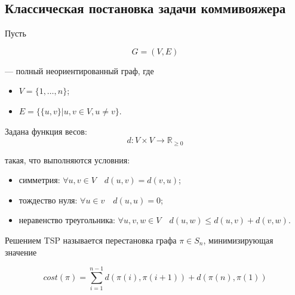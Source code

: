 \subsection{Классическая постановка задачи коммивояжера}

Пусть

\begin{equation}
    G = (V, E)
\end{equation}

--- полный неориентированный граф, где

\begin{itemize}
    \item $V = \{1, \dots, n\}$;
    \item $E = \{\{u, v\} | u, v \in V, u \neq v\}$.
\end{itemize}

Задана функция весов:
\begin{equation}
    d: V \times V \to \mathbb{R}_{\geq 0}
\end{equation}

такая, что выполняются условния:

\begin{itemize}
    \item симметрия: $\forall u, v \in V \quad d(u, v) = d(v, u)$;
    \item тождество нуля: $ \forall u \in v \quad d(u, u) = 0 $;
    \item неравенство треугольника: $ \forall u, v, w \in V \quad d(u, w) \leq d(u, v) + d(v, w) $.
\end{itemize}

Решением TSP называется перестановка графа $ \pi \in S_n $, минимизирующая значение

\begin{equation}
    cost(\pi) = \sum_{i=1}^{n-1} d(\pi(i), \pi(i+1)) + d(\pi(n), \pi(1))
\end{equation}

